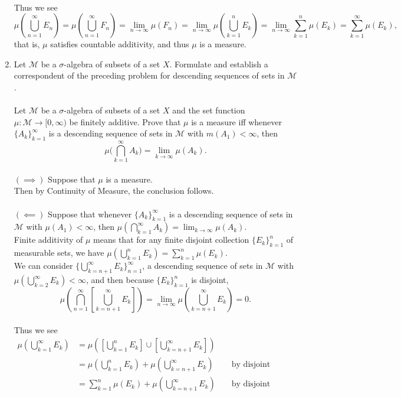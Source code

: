 \begin{enumerate}
	\\Thus we see
	\[
		\mu(\bigcup_{n=1}^\infty E_n)=\mu(\bigcup_{n=1}^\infty F_n)=\lim_{n \to \infty} \mu(F_n)=\lim_{n \to \infty} \mu(\bigcup_{k=1}^n E_k)=\lim_{n \to \infty}\sum_{k=1}^n\mu(E_k)=\sum_{k=1}^\infty\mu(E_k),
	\]
	that is, $\mu$ satisfies countable additivity, and thus $\mu$ is a measure.
	\item Let $\mathcal{M}$ be a $\sigma$-algebra of subsets of a set $X$. Formulate and establish a correspondent of the preceding problem for descending sequences of sets in $\mathcal{M}$.\\
	\\Let $\mathcal{M}$ be a $\sigma$-algebra of subsets of a set $X$ and the set function $\mu : \mathcal{M} \to [0,\infty)$ be finitely additive.
	Prove that $\mu$ is a measure iff whenever $\{A_k\}_{k=1}^\infty$ is a descending sequence of sets in $\mathcal{M}$ with $m(A_1)<\infty$, then
	\[
	\mu \biggl ( \bigcap_{k=1}^\infty A_k \biggr ) = \lim_{k \to \infty} \mu(A_k).	
	\]
	\\$(\implies)$ Suppose that $\mu$ is a measure.\\
	Then by Continuity of Measure, the conclusion follows.\\
	\\$(\impliedby)$ Suppose that whenever $\{A_k\}_{k=1}^\infty$ is a descending sequence of sets in $\mathcal{M}$ with $\mu(A_1)<\infty$, then $\mu ( \bigcap_{k=1}^\infty A_k ) = \lim_{k \to \infty} \mu(A_k)$.\\
	Finite additivity of $\mu$ means that for any finite disjoint collection $\{E_k\}_{k=1}^n$ of measurable sets, we have $\mu(\bigcup_{k=1}^n E_k)=\sum_{k=1}^n\mu(E_k)$.
	\\We can consider $\{\bigcup_{k={n+1}}^\infty E_k\}_{n=1}^\infty$, a descending sequence of sets in $\mathcal{M}$ with $\mu(\bigcup_{k=2}^\infty E_k)<\infty$, and then because $\{E_k\}_{k=1}^n$ is disjoint,
	\[
		\mu ( \bigcap_{n=1}^\infty [\bigcup_{k={n+1}}^\infty E_k]) = \lim_{n \to \infty} \mu(\bigcup_{k={n+1}}^\infty E_k)=0.
	\]
	\\Thus we see
	\begin{align*}
		\mu(\bigcup_{k=1}^\infty E_k)&=\mu([\bigcup_{k=1}^n E_k]\cup[\bigcup_{k={n+1}}^\infty E_k])\\
		&=\mu(\bigcup_{k=1}^n E_k)+\mu(\bigcup_{k={n+1}}^\infty E_k)&&\text{ by disjoint additivity}\\
		&=\sum_{k=1}^n\mu( E_k)+\mu(\bigcup_{k={n+1}}^\infty E_k)&&\text{ by disjoint additivity}
	\end{align*}

\end{enumerate}
